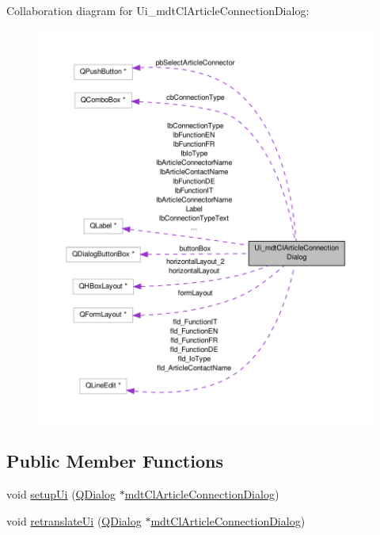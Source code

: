 Collaboration diagram for Ui\-\_\-mdt\-Cl\-Article\-Connection\-Dialog\-:
\nopagebreak
\begin{figure}[H]
\begin{center}
\leavevmode
\includegraphics[width=350pt]{class_ui__mdt_cl_article_connection_dialog__coll__graph}
\end{center}
\end{figure}
\subsection*{Public Member Functions}
\begin{DoxyCompactItemize}
\item 
void \hyperlink{class_ui__mdt_cl_article_connection_dialog_a2c93c7064749c657097287478b768c6d}{setup\-Ui} (\hyperlink{class_q_dialog}{Q\-Dialog} $\ast$\hyperlink{classmdt_cl_article_connection_dialog}{mdt\-Cl\-Article\-Connection\-Dialog})
\item 
void \hyperlink{class_ui__mdt_cl_article_connection_dialog_ad4e9f7265bd0ead238e88f0644979b84}{retranslate\-Ui} (\hyperlink{class_q_dialog}{Q\-Dialog} $\ast$\hyperlink{classmdt_cl_article_connection_dialog}{mdt\-Cl\-Article\-Connection\-Dialog})
\end{DoxyCompactItemize}
